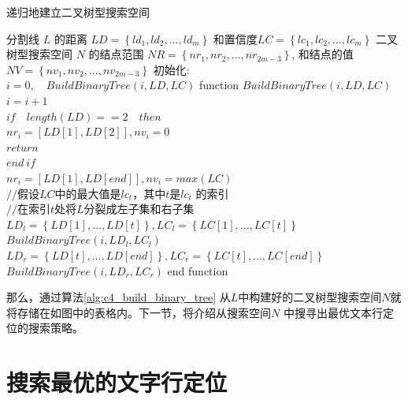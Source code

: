     \begin{algorithm}[!h]
	\renewcommand{\algorithmicrequire}{\textbf{输入:}}
	\renewcommand{\algorithmicensure}{\textbf{输出:}}
	\caption{递归地建立二叉树型搜索空间}
	\label{alg:c4_build_binary_tree}
	\begin{algorithmic}[1]
		\REQUIRE 分割线 $L$ 的距离 $LD=\left\{ld_1,ld_2,...,ld_m\right\}$ 和置信度$LC=\left\{lc_1,lc_2,...,lc_m\right\}$
		\ENSURE 二叉树型搜索空间 $N$ 的结点范围 $NR=\left\{nr_1,nr_2,...,nr_{2m-3}\right\}$, 和结点的值 $NV=\left\{nv_1,nv_2,...,nv_{2m-3}\right\}$
      \STATE 初始化: \\
      \STATE \quad $i=0, \quad BuildBinaryTree(i,LD,LC)$
      \STATE function $BuildBinaryTree(i,LD,LC)$
        \\\STATE \quad $i=i+1$
        \\\STATE \quad $if \quad length(LD)==2 \quad then$
        \\\STATE \qquad $nr_{i}=[LD[1],LD[2]], nv_{i}=0$
        \\\STATE \qquad $return$
        \\\STATE \quad $end \ if$
        \\\STATE \quad $nr_{i}=[LD[1],LD[end]], nv_{i}=max(LC)$
        \\\STATE \quad $//$假设$LC$中的最大值是$lc_t$，其中$t$是$lc_t$ 的索引
        \\\STATE \quad $//$在索引$t$处将$L$分裂成左子集和右子集
        \\\STATE \quad $LD_{l}=\left\{LD[1],...,LD[t]\right\}, LC_{l}=\left\{LC[1],...,LC[t]\right\}$
        \\\STATE \quad $BuildBinaryTree(i,LD_{l},LC_{l})$
        \\\STATE \quad $LD_{r}=\left\{LD[t],...,LD[end]\right\}, LC_{r}=\left\{LC[t],...,LC[end]\right\}$
        \\\STATE \quad $BuildBinaryTree(i,LD_{r},LC_{r})$
      \STATE end function
	\end{algorithmic}
    \end{algorithm}

    那么，通过算法\ref{alg:c4_build_binary_tree} 从$L$中构建好的二叉树型搜索空间$N$就将存储在如图中的表格内。下一节，将介绍从搜索空间$N$ 中搜寻出最优文本行定位的搜索策略。

    \section{搜索最优的文字行定位}

